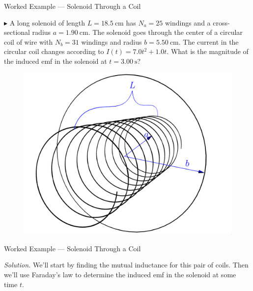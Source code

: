\documentclass{beamer}
\begin{document}
\begin{frame}{Worked Example --- Solenoid Through a Coil}

$\blacktriangleright$ A long solenoid of length $L = \SI{18.5}{\centi\metre}$ has $N_a = 25$ windings and a cross-sectional radius $a = \SI{1.90}{\centi\metre}$. The solenoid goes through the center of a circular coil of wire with $N_b = 31$ windings and radius $b = \SI{5.50}{\centi\metre}$. The current in the circular coil changes according to $I(t) = 7.0 t^2 + 1.0 t$. What is the magnitude of the induced emf in the solenoid at $t = \SI{3.00}{\second}$?

\begin{figure}[H]
\centering
\includegraphics[height=0.5\textheight]{figures/solenoid_and_loop.png}
\end{figure}

\end{frame}

\begin{frame}{Worked Example --- Solenoid Through a Coil}

\textit{Solution.} We'll start by finding the mutual inductance for this pair of coils. Then we'll use Faraday's law to determine the induced emf in the solenoid at some time $t$.

\end{frame}
\end{document}
